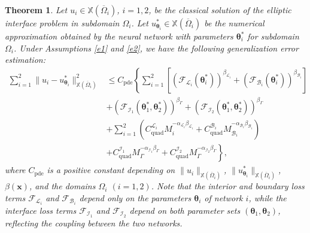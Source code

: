 \documentclass{article}
\newtheorem{theorem}{Theorem}[section]
\begin{document}
\begin{theorem}
Let $u_i \in \mathbb{X}(\overline{\Omega}_i)$, $i = 1, 2$, be the classical solution of the elliptic interface problem in subdomain $\Omega_i$. Let $u_{\boldsymbol{\theta}_i}^{*} \in \mathbb{X}(\overline{\Omega}_i)$ be the numerical approximation obtained by the neural network with parameters $\boldsymbol{\theta}_i^*$ for subdomain $\Omega_i$. Under Assumptions \ref{e1} and \ref{e2}, we have the following generalization error estimation:
\begin{equation}
\begin{aligned}
    \sum_{i=1}^{2} \|u_i - u_{\boldsymbol{\theta}_i}^{*}\|^2_{\mathbb{X}(\overline{\Omega}_i)} &\leq C_{\text{pde}} \left\{ \sum_{i=1}^{2} \left[ (\mathcal{F}_{\mathcal{L}_i}(\boldsymbol{\theta}_i^*))^{\beta_{\mathcal{L}_i}} + (\mathcal{F}_{\mathcal{B}_i}(\boldsymbol{\theta}_i^*))^{\beta_{\mathcal{B}_i}} \right] \right.\\
&\left. + (\mathcal{F}_{\mathcal{I}_1}(\boldsymbol{\theta}_1^*, \boldsymbol{\theta}_2^*))^{\beta_{\Gamma}} + (\mathcal{F}_{\mathcal{I}_2}(\boldsymbol{\theta}_1^*, \boldsymbol{\theta}_2^*))^{\beta_{\Gamma}}\right.\\
&\left. + \sum_{i=1}^{2} \left( C_{\text{quad}}^{\mathcal{L}_i}M_{i}^{-\alpha_{\mathcal{L}_i}\beta_{\mathcal{L}_i}} + C_{\text{quad}}^{\mathcal{B}_i}M_{\mathcal{B}_i}^{-\alpha_{\mathcal{B}_i}\beta_{\mathcal{B}_i}}  \right) \right.\\
&\left. + C_{\text{quad}}^{\mathcal{I}_1}M_{\Gamma}^{-\alpha_{\mathcal{I}_1}\beta_{\Gamma}} + C_{\text{quad}}^{{\mathcal{I}_2}}M_{\Gamma}^{-\alpha_{\mathcal{I}_2}\beta_{\Gamma}} \right\},
\end{aligned}
\end{equation}
where $C_{\text{pde}}$ is a positive constant depending on $\|u_i\|_{\mathbb{X}(\overline{\Omega}_i)}$, $\|u_{\boldsymbol{\theta}_i}^{*}\|_{\mathbb{X}(\overline{\Omega}_i)}$, $\beta(\boldsymbol{x})$, and the domains $\Omega_i$ $(i = 1, 2)$. Note that the interior and boundary loss terms $\mathcal{F}_{\mathcal{L}_i}$ and $\mathcal{F}_{\mathcal{B}_i}$ depend only on the parameters $\boldsymbol{\theta}_i$ of network $i$, while the interface loss terms $\mathcal{F}_{\mathcal{I}_1}$ and $\mathcal{F}_{\mathcal{I}_2}$ depend on both parameter sets $(\boldsymbol{\theta}_1, \boldsymbol{\theta}_2)$, reflecting the coupling between the two networks.
\end{theorem}
\end{document}
